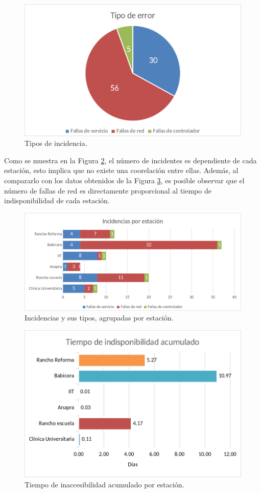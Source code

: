 \begin{figure}[!ht]
   \centering
   \includegraphics[width=0.7\linewidth]{images/graphs/by_type.png}
   \caption{Tipos de incidencia.}
   \label{fig:station-errors-by-type}
\end{figure}

Como se muestra en la Figura \ref{fig:station-incidents}, el número de incidentes es dependiente de cada estación, esto implica que no existe una coorelación entre ellas. Además, al compararlo con los datos obtenidos de la Figura \ref{fig:cumulated-downtime}, es posible observar que el número de fallas de red es directamente proporcional al tiempo de indisponibilidad de cada estación.

\begin{figure}[!ht]
   \centering
   \includegraphics[width=0.9\linewidth]{images/graphs/by_station_incidents.png}
   \caption{Incidencias y sus tipos, agrupadas por estación.}
   \label{fig:station-incidents}
\end{figure}

\begin{figure}[!ht]
   \centering
   \includegraphics[width=0.65\linewidth]{images/graphs/cumulated_downtime.png}
   \caption{Tiempo de inaccesibilidad acumulado por estación.}
   \label{fig:cumulated-downtime}
\end{figure}

